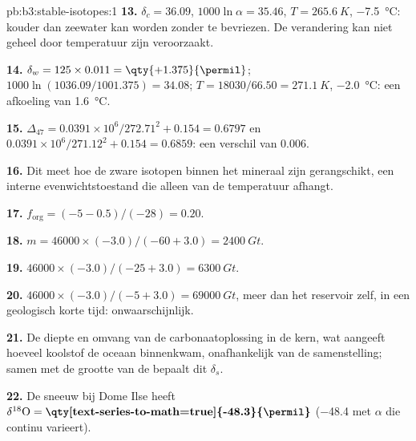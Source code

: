 \begin{solution}{pb:b3:stable-isotopes:1}
\textbf{13.} $\delta_c = 36.09$, $1000\ln\alpha = 35.46$, $T = \qty{265.6}{K}$,
\qty{-7.5}{\celsius}: kouder dan zeewater kan worden zonder te bevriezen. De
verandering kan niet geheel door temperatuur zijn veroorzaakt.

\textbf{14.} $\delta_w = 125\times0.011 = \qty{+1.375}{\permil}$; $1000\ln(1036.09/1001.375)
= 34.08$; $T = 18030/66.50 = \qty{271.1}{K}$, \qty{-2.0}{\celsius}: een afkoeling van
\qty{1.6}{\celsius}.

\textbf{15.} $\Delta_{47} = 0.0391\times10^6/272.71^2 + 0.154 = 0.6797$ en
$0.0391\times10^6/271.12^2 + 0.154 = 0.6859$: een verschil van
\qty{0.006}{\permil}.

\textbf{16.} Dit meet hoe de zware isotopen binnen het
mineraal zijn gerangschikt, een interne evenwichtstoestand die alleen van de temperatuur afhangt.

\textbf{17.} $f_{\mathrm{org}} = (-5 - 0.5)/(-28) = 0.20$.

\textbf{18.} $m = 46000\times(-3.0)/(-60 + 3.0) = \qty{2400}{Gt}$.

\textbf{19.} $46000\times(-3.0)/(-25 + 3.0) = \qty{6300}{Gt}$.

\textbf{20.} $46000\times(-3.0)/(-5 + 3.0) = \qty{69000}{Gt}$, meer dan het
reservoir zelf, in een geologisch korte tijd: onwaarschijnlijk.

\textbf{21.} De diepte en omvang van de carbonaatoplossing in de kern, wat
aangeeft hoeveel koolstof de oceaan binnenkwam, onafhankelijk van de samenstelling;
samen met de grootte van de  bepaalt dit $\delta_s$.

\textbf{22.} De sneeuw bij Dome Ilse heeft $\delta^{18}\mathrm O =
\textbf{\qty[text-series-to-math=true]{-48.3}{\permil}} $ (\qty{-48.4}{\permil}
met $\alpha$ die continu varieert).
\end{solution}
